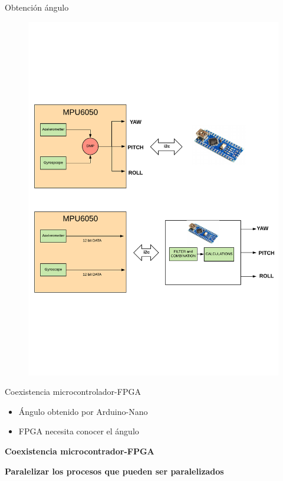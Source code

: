\documentclass{beamer}
\begin{document}
\begin{frame}{Obtención ángulo}
	\begin{figure}[H]
		\center
		\includegraphics[trim = 0mm 5cm 0mm 5cm, clip,scale=0.4]{imagenes/Balancing_robot/DMPexample.pdf}
	\end{figure} 
\end{frame}


\begin{frame}{Coexistencia microcontrolador-FPGA}
\begin{block}{}
	\begin{itemize}
		\item Ángulo obtenido por Arduino-Nano \pause
		\item FPGA necesita conocer el ángulo \pause
	\end{itemize}
\end{block}
\begin{alertblock}{}
	\centering \textbf{Coexistencia microcontrador-FPGA}  \pause
\end{alertblock}
\begin{alertblock}{}
	\centering \textbf{Paralelizar los procesos que pueden ser paralelizados} \pause 
\end{alertblock}
\end{frame}
\end{document}
